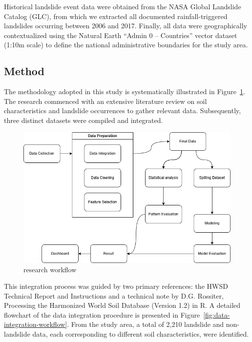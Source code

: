 Historical landslide event data were obtained from the NASA Global Landslide Catalog (GLC), from which we extracted all documented rainfall-triggered landslides occurring between 2006 and 2017. Finally, all data were geographically contextualized using the Natural Earth “Admin 0 – Countries” vector dataset (1:10m scale) to define the national administrative boundaries for the study area.


\subsection{Method}

The methodology adopted in this study is systematically illustrated in Figure~\ref{fig:research-workflow}. The research commenced with an extensive literature review on soil characteristics and landslide occurrences to gather relevant data. Subsequently, three distinct datasets were compiled and integrated.

\begin{figure}[htbp]
    \centerline{\includegraphics[width=\linewidth]{fig2.png}}
    \caption{research workflow}
    \label{fig:research-workflow}
\end{figure}
This integration process was guided by two primary references: the HWSD Technical Report and Instructions and a technical note by D.G. Rossiter, Processing the Harmonized World Soil Database (Version 1.2) in R. A detailed flowchart of the data integration procedure is presented in Figure~\ref{fig:data-integration-workflow}. From the study area, a total of 2,210 landslide and non-landslide data, each corresponding to different soil characteristics, were identified.


